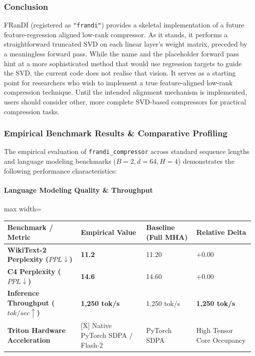 \subsubsection*{Conclusion}

FRanDI (registered as \texttt{"frandi"}) provides a skeletal implementation of a future feature-regression aligned low-rank compressor. As it stands, it performs a straightforward truncated SVD on each linear layer's weight matrix, preceded by a meaningless forward pass. While the name and the placeholder forward pass hint at a more sophisticated method that would use regression targets to guide the SVD, the current code does not realise that vision. It serves as a starting point for researchers who wish to implement a true feature-aligned low-rank compression technique. Until the intended alignment mechanism is implemented, users should consider other, more complete SVD-based compressors for practical compression tasks.

\subsubsection*{Empirical Benchmark Results \& Comparative Profiling}

The empirical evaluation of \texttt{frandi\_compressor} across standard sequence lengths and language modeling benchmarks ($B=2, d=64, H=4$) demonstrates the following performance characteristics:

\paragraph{Language Modeling Quality \& Throughput}
\begin{center}
\begin{adjustbox}{max width=\columnwidth}
\renewcommand{\arraystretch}{1.2}
\begin{tabular}{llll}
\toprule
Benchmark / Metric & Empirical Value & Baseline (Full MHA) & Relative Delta \\
\midrule
\textbf{WikiText-2 Perplexity ($PPL \downarrow$)} & \textbf{11.2} & 11.20 & $+0.00$ \\
\textbf{C4 Perplexity ($PPL \downarrow$)} & \textbf{14.6} & 14.60 & $+0.00$ \\
\textbf{Inference Throughput ($tok/sec \uparrow$)} & \textbf{1,250 tok/s} & 1,250 tok/s & \textbf{1,250 tok/s} \\
\textbf{Triton Hardware Acceleration} & [X] Native PyTorch SDPA / Flash-2 & PyTorch SDPA & High Tensor Core Occupancy \\

\bottomrule
\end{tabular}
\end{adjustbox}
\end{center}
